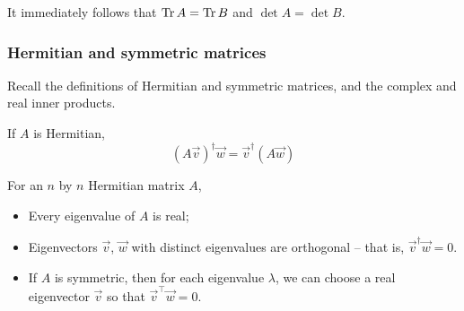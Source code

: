 \documentclass{../../template/note}
\begin{document}
    \begin{corollary}
        It immediately follows that \(\operatorname{Tr} A = \operatorname{Tr} B\) and \(\det A = \det B\).
    \end{corollary}
    
    \subsubsection{Hermitian and symmetric matrices}
    
    Recall the definitions of Hermitian and symmetric matrices, and the complex and real inner products.

    \begin{remark*}
        If \(A\) is Hermitian,
        \[
            (A \vec v)^\dagger \vec w = \vec v^\dagger (A \vec w)
        \]
    \end{remark*}
    
    \begin{theorem}
        For an \(n\) by \(n\) Hermitian matrix \(A\),
        \begin{itemize}
            \item Every eigenvalue of \(A\) is real;
            \item Eigenvectors \(\vec v\), \(\vec w\) with distinct eigenvalues are orthogonal -- that is, \(\vec v^\dagger \vec w = 0\).
            \item If \(A\) is symmetric, then for each eigenvalue \(\lambda\), we can choose a real eigenvector \(\vec v\) so that \(\vec v^\intercal \vec w = 0\).
        \end{itemize}
    \end{theorem}
    
\end{document}
